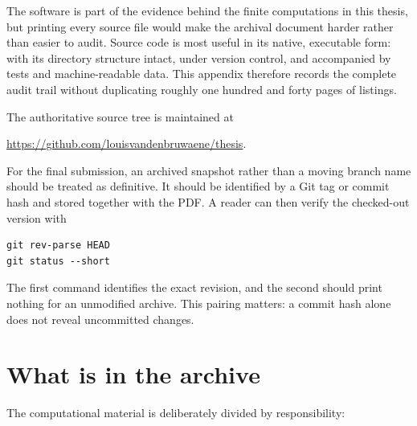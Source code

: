 The software is part of the evidence behind the finite computations in this thesis, but printing every source file would make the archival document harder rather than easier to audit. Source code is most useful in its native, executable form: with its directory structure intact, under version control, and accompanied by tests and machine-readable data. This appendix therefore records the complete audit trail without duplicating roughly one hundred and forty pages of listings.

The authoritative source tree is maintained at
\begin{center}
\url{https://github.com/louisvandenbruwaene/thesis}.
\end{center}
For the final submission, an archived snapshot rather than a moving branch name should be treated as definitive. It should be identified by a Git tag or commit hash and stored together with the PDF. A reader can then verify the checked-out version with
\begin{verbatim}
git rev-parse HEAD
git status --short
\end{verbatim}
The first command identifies the exact revision, and the second should print nothing for an unmodified archive. This pairing matters: a commit hash alone does not reveal uncommitted changes.

\section{What is in the archive}\label{app:software-layout}

The computational material is deliberately divided by responsibility:

